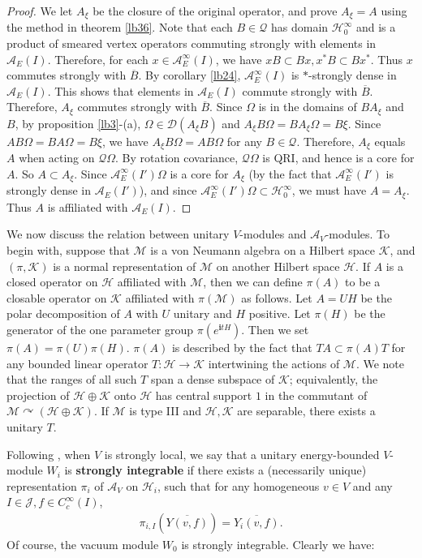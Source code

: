 \documentclass[11pt,b5paper,notitlepage]{article}
\theoremstyle{definition}
\theoremstyle{plain}
\newcommand{\mc}{\mathcal}
\newcommand{\ovl}{\overline}
\newcommand{\Dom}{\scr D}
\newcommand{\scr}{\mathscr}
\newcommand{\im}{\mathbf{i}}
\numberwithin{equation}{subsection}
\begin{document}
\begin{proof}
We let $A_\xi$ be the closure of the original operator, and prove $A_\xi=A$ using the method in theorem \ref{lb36}. Note that each $B\in\mc Q$ has domain $\mc H_0^\infty$ and is a product of smeared vertex operators commuting strongly with elements in $\mc A_E(I)$. Therefore, for each $x\in\mc A_E^\infty(I)$, we have $xB\subset Bx,x^*B\subset Bx^*$. Thus $x$ commutes strongly with $\ovl B$. By corollary \ref{lb24}, $\mc A_E^\infty(I)$ is $*$-strongly dense in $\mc A_E(I)$. This shows that elements in $\mc A_E(I)$ commute strongly with $\ovl B$. Therefore,  $A_\xi$ commutes strongly with $\ovl B$. Since $\Omega$ is in the domains of $BA_\xi$ and $B$, by proposition \ref{lb3}-(a), $\Omega\in\Dom(A_\xi B)$ and $A_\xi B\Omega=BA_\xi\Omega=B\xi$. Since $AB\Omega=BA\Omega=B\xi$, we have $A_\xi B\Omega=AB\Omega$ for any $B\in\mc Q$. Therefore,  $A_\xi$ equals $A$ when acting on $\mc Q\Omega$. By rotation covariance, $\mc Q\Omega$ is QRI, and hence is a core for $A$. So $A\subset A_\xi$. Since $\mc A_E^\infty(I')\Omega$ is a core for $A_\xi$ (by the fact that $\mc A_E^\infty(I')$ is strongly dense in $\mc A_E(I')$), and since $\mc A_E^\infty(I')\Omega\subset\mc H_0^\infty$, we must have $A=A_\xi$. Thus $A$ is affiliated with $\mc A_E(I)$.
\end{proof}






We now discuss the relation between unitary $V$-modules and $\mc A_V$-modules. To begin with, suppose that $\mc M$ is a von Neumann algebra on a Hilbert space $\mc K$, and $(\pi,\mc K)$ is a normal representation of $\mc M$ on another Hilbert space $\mc H$. If $A$ is a closed operator on $\mc H$ affiliated with $\mc M$, then we can define $\pi(A)$ to be a closable operator on $\mc K$ affiliated with $\pi(\mc M)$ as follows. Let $A=UH$ be the polar decomposition of $A$ with $U$ unitary and $H$ positive. Let $\pi(H)$ be the generator of the one parameter group $\pi(e^{\im t H})$. Then we set $\pi(A)=\pi(U)\pi(H)$. $\pi(A)$ is described by the fact that $TA\subset\pi(A)T$ for any bounded linear operator $T:\mc H\rightarrow\mc K$ intertwining the actions of $\mc M$. We note that the ranges of all such $T$ span a dense subspace of $\mc K$; equivalently, the projection of $\mc H\oplus\mc K$ onto $\mc H$ has central support $1$ in the commutant of $\mc M\curvearrowright(\mc H\oplus\mc K)$. If $\mc M$ is type III and $\mc H,\mc K$ are separable, there exists a unitary $T$.

Following \cite{CWX}, when $V$ is strongly local, we say that a unitary energy-bounded $V$-module $W_i$ is \textbf{strongly integrable} if there exists a (necessarily unique) representation $\pi_i$ of $\mc A_V$ on $\mc H_i$, such that for any homogeneous $v\in V$ and any $I\in\mc J,f\in C_c^\infty(I)$,
\begin{align}
\pi_{i,I}(\ovl{Y(v,f)})=\ovl{Y_i(v,f)}.\label{eq36}
\end{align}
Of course, the vacuum module $W_0$ is strongly integrable. Clearly we have:
\end{document}
